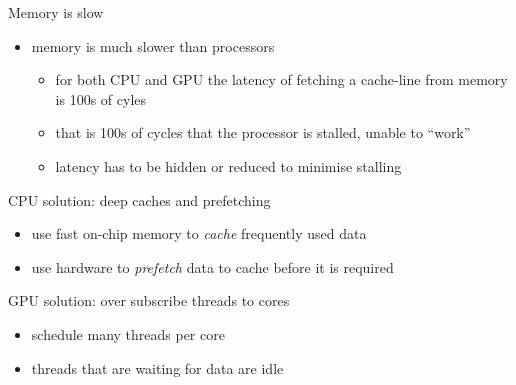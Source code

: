 \documentclass[aspectratio=43]{beamer}
\begin{document}
\begin{frame}[fragile]{}
    \begin{info}{Memory is slow}
        \begin{itemize}
            \item memory is much slower than processors
            \begin{itemize}
                \item for both CPU and GPU the latency of fetching a cache-line from memory is 100s of cyles
                \item that is 100s of cycles that the processor is stalled, unable to ``work''
                \item latency has to be hidden or reduced to minimise stalling
            \end{itemize}
        \end{itemize}
    \end{info}
    \begin{info}{CPU solution: deep caches and prefetching}
        \begin{itemize}
            \item use fast on-chip memory to \emph{cache} frequently used data
            \item use hardware to \emph{prefetch} data to cache before it is required
        \end{itemize}
    \end{info}
    \begin{info}{GPU solution: over subscribe threads to cores}
        \begin{itemize}
            \item schedule many threads per core
            \item threads that are waiting for data are idle
        \end{itemize}
    \end{info}
\end{frame}
\end{document}
